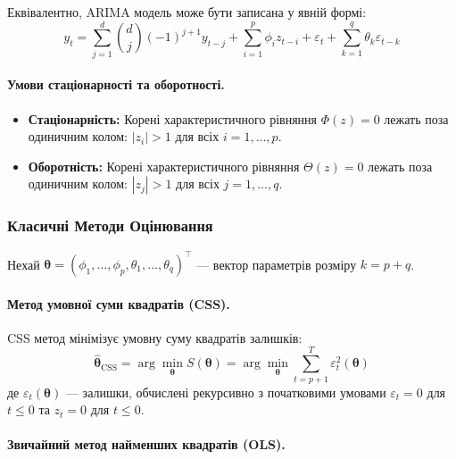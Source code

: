 \documentclass[12pt,a4paper]{article}
\begin{document}
Еквівалентно, ARIMA модель може бути записана у явній формі:
\begin{equation}
\label{eq:arima_explicit}
y_t = \sum_{j=1}^{d} \binom{d}{j} (-1)^{j+1} y_{t-j} + \sum_{i=1}^{p} \phi_i z_{t-i} + \varepsilon_t + \sum_{k=1}^{q} \theta_k \varepsilon_{t-k}
\end{equation}

\paragraph{Умови стаціонарності та оборотності.}

\begin{itemize}
    \item \textbf{Стаціонарність:} Корені характеристичного рівняння $\Phi(z) = 0$ лежать поза одиничним колом: $|z_i| > 1$ для всіх $i = 1, \ldots, p$.

    \item \textbf{Оборотність:} Корені характеристичного рівняння $\Theta(z) = 0$ лежать поза одиничним колом: $|z_j| > 1$ для всіх $j = 1, \ldots, q$.
\end{itemize}

\subsubsection{Класичні Методи Оцінювання}

Нехай $\boldsymbol{\theta} = (\phi_1, \ldots, \phi_p, \theta_1, \ldots, \theta_q)^\top$ --- вектор параметрів розміру $k = p + q$.

\paragraph{Метод умовної суми квадратів (CSS).}

CSS метод мінімізує умовну суму квадратів залишків:
\begin{equation}
\label{eq:css}
\hat{\boldsymbol{\theta}}_{\text{CSS}} = \arg\min_{\boldsymbol{\theta}} S(\boldsymbol{\theta}) = \arg\min_{\boldsymbol{\theta}} \sum_{t=p+1}^{T} \varepsilon_t^2(\boldsymbol{\theta})
\end{equation}
де $\varepsilon_t(\boldsymbol{\theta})$ --- залишки, обчислені рекурсивно з початковими умовами $\varepsilon_t = 0$ для $t \leq 0$ та $z_t = 0$ для $t \leq 0$.

\paragraph{Звичайний метод найменших квадратів (OLS).}
\end{document}
